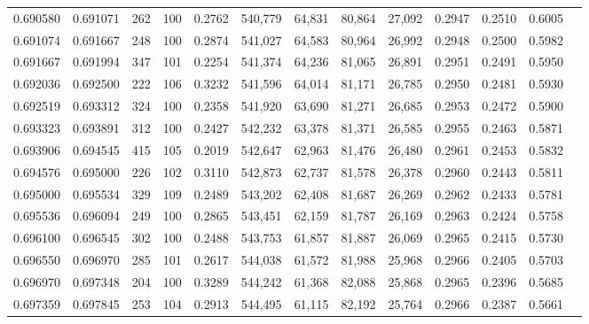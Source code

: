 \begin{tabular}{rrrrrrrrrrrrr}
0.690580 & 0.691071 &    262 &   100 &                                     0.2762 & 540,779 &  64,831 &  80,864 &  27,092 & 0.2947 & 0.2510 & 0.6005 \\
0.691074 & 0.691667 &    248 &   100 &                                     0.2874 & 541,027 &  64,583 &  80,964 &  26,992 & 0.2948 & 0.2500 & 0.5982 \\
0.691667 & 0.691994 &    347 &   101 &                                     0.2254 & 541,374 &  64,236 &  81,065 &  26,891 & 0.2951 & 0.2491 & 0.5950 \\
0.692036 & 0.692500 &    222 &   106 &                                     0.3232 & 541,596 &  64,014 &  81,171 &  26,785 & 0.2950 & 0.2481 & 0.5930 \\
0.692519 & 0.693312 &    324 &   100 &                                     0.2358 & 541,920 &  63,690 &  81,271 &  26,685 & 0.2953 & 0.2472 & 0.5900 \\
0.693323 & 0.693891 &    312 &   100 &                                     0.2427 & 542,232 &  63,378 &  81,371 &  26,585 & 0.2955 & 0.2463 & 0.5871 \\
0.693906 & 0.694545 &    415 &   105 &                                     0.2019 & 542,647 &  62,963 &  81,476 &  26,480 & 0.2961 & 0.2453 & 0.5832 \\
0.694576 & 0.695000 &    226 &   102 &                                     0.3110 & 542,873 &  62,737 &  81,578 &  26,378 & 0.2960 & 0.2443 & 0.5811 \\
0.695000 & 0.695534 &    329 &   109 &                                     0.2489 & 543,202 &  62,408 &  81,687 &  26,269 & 0.2962 & 0.2433 & 0.5781 \\
0.695536 & 0.696094 &    249 &   100 &                                     0.2865 & 543,451 &  62,159 &  81,787 &  26,169 & 0.2963 & 0.2424 & 0.5758 \\
0.696100 & 0.696545 &    302 &   100 &                                     0.2488 & 543,753 &  61,857 &  81,887 &  26,069 & 0.2965 & 0.2415 & 0.5730 \\
0.696550 & 0.696970 &    285 &   101 &                                     0.2617 & 544,038 &  61,572 &  81,988 &  25,968 & 0.2966 & 0.2405 & 0.5703 \\
0.696970 & 0.697348 &    204 &   100 &                                     0.3289 & 544,242 &  61,368 &  82,088 &  25,868 & 0.2965 & 0.2396 & 0.5685 \\
0.697359 & 0.697845 &    253 &   104 &                                     0.2913 & 544,495 &  61,115 &  82,192 &  25,764 & 0.2966 & 0.2387 & 0.5661 \\

\end{tabular}
